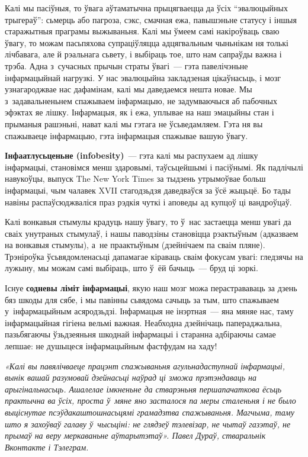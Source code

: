 Калі мы пасіўныя, то ўвага аўтаматычна прыцягваецца да ўсіх ``эвалюцыйных трыгераў'': сьмерць або пагроза, сэкс, смачная ежа, павышэньне статусу і іншыя старажытныя праграмы выжываньня. Калі мы ўмеем самі накіроўваць сваю ўвагу, то можам пасьпяхова супраціўляцца адцягвальным чыньнікам ня толькі лічбавага, але й рэальнага сьвету, і выбіраць тое, што нам сапраўды важна і трэба. Адна з~сучасных прычын страты ўвагі~--- гэта павелічэньне інфармацыйнай нагрузкі. У нас эвалюцыйна закладзеная цікаўнасьць, і мозг узнагароджвае нас дафамінам, калі мы даведаемся нешта новае. Мы з~задавальненьнем спажываем інфармацыю, не задумваючыся аб пабочных эфэктах яе лішку. Інфармацыя, як і ежа, уплывае на наш эмацыйны стан і прыманыя рашэньні, нават калі мы гэтага не ўсьведамляем. Гэта ня вы спажываеце інфармацыю, гэта інфармацыя спажывае вашую ўвагу.

\textbf{Інфаатлусьценьне (infobesity)}~--- гэта калі мы распухаем ад лішку інфармацыі, становімся менш здаровымі, таўсьцейшымі і пасіўнымі. Як падлічылі навукоўцы, выпуск The New York Times за тыдзень утрымоўвае больш інфармацыі, чым чалавек XVII стагодзьдзя даведваўся за ўсё жыцьцё. Бо тады навіны распаўсюджваліся праз рэдкія чуткі і аповеды ад купцоў ці вандроўцаў.

Калі вонкавыя стымулы крадуць нашу ўвагу, то ў~нас застаецца менш увагі да сваіх унутраных стымулаў, і нашы паводзіны становіцца рэактыўным (адказваем на вонкавыя стымулы), а~не праактыўным (дзейнічаем па сваім пляне). Трэніроўка ўсьвядомленасьці дапамагае кіраваць сваім фокусам увагі: гледзячы на лужыну, мы можам самі выбіраць, што ў~ёй бачыць~--- бруд ці зоркі.


Існуе \textbf{содневы ліміт інфармацыі}, якую наш мозг можа перастрававаць за дзень бяз шкоды для сябе, і мы павінны сьвядома сачыць за тым, што спажываем у~інфармацыйным асяродзьдзі. Інфармацыя не інэртная~--- яна мяняе нас, таму інфармацыйная гігіена вельмі важная. Неабходна дзейнічаць папераджальна, пазьбягаючы ўзьдзеяньня шкоднай інфармацыі і старанна адбіраючы самае лепшае: не душыцеся інфармацыйным фастфудам на хаду!

\emph{«Калі вы павялічваеце працэнт спажываньня агульнадаступнай інфармацыі, вынік вашай разумовай дзейнасьці наўрад ці зможа прэтэндаваць на арыгінальнасьць. Ашалелае імкненьне да стварэньня першапачаткова ёсьць практычна ва ўсіх, проста ў~мяне яно засталося па меры сталеньня і не было выціснутае псэўдакаштошнасьцямі грамадзтва спажываньня. Магчыма, таму што я захоўваў галаву ў~чысьціні: не глядзеў тэлевізар, не чытаў газэтаў, не прымаў на веру меркаваньне аўтарытэтаў». Павел Дураў, стваральнік Вконтакте і Тэлеграм.} 

